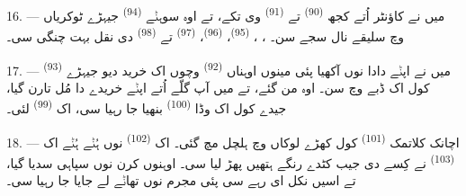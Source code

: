 16. --- میں نے کاؤنٹر اُتے کجھ  \textsuperscript{(90)} تے
 \textsuperscript{(91)} وی تکے، تے اوہ سوہݨے
 \textsuperscript{(94)} جیہڑے ٹوکریاں وچ سلیقے نال سجے سن۔
، ،  \textsuperscript{(95)}،
 \textsuperscript{(96)}،  \textsuperscript{(97)} تے
 \textsuperscript{(98)} دی نقل بہت چنگی سی۔

\VUsaut{4.4mm}
\VUsaut{2.8mm}

17. --- میں نے اپݨے دادا نوں آکھیا پئی مینوں اوہناں 
\textsuperscript{(92)} وچوں اک خرید دیو جیہڑے 
\textsuperscript{(93)} کول اک ڈبے وچ سن۔ اوہ من گئے، تے میں آپ گلّے اُتے اپݨے خریدے
دا مُل تارن گیا، جیدے کول اک وڈا  \textsuperscript{(100)} بنھیا جا رہیا
سی، اک  \textsuperscript{(99)} لئی۔

18. --- اچانک کلاتمک  \textsuperscript{(101)} کول کھڑے لوکاں
وچ ہلچل مچ گئی۔ اک  \textsuperscript{(102)} نوں ہُݨے ہُݨے اک
 \textsuperscript{(103)} نے کِسے دی جیب کٹدے رنگے ہتھیں پھڑ لیا
سی۔ اوہنوں  کرن نوں سپاہی سدیا گیا، تے اسیں نکل ای رہے سی پئی مجرم
نوں تھاݨے لے جایا جا رہیا سی۔
\VUsaut{6.0mm}
\VUfilet{22mm}
